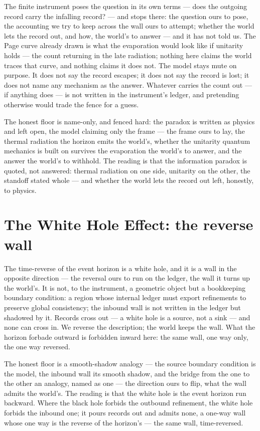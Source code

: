 The finite instrument poses the question in its own terms --- does the outgoing record carry the infalling
record? --- and stops there: the question ours to pose, the accounting we try to keep across the wall ours to
attempt; whether the world lets the record out, and how, the world's to answer --- and it has not told us.
The Page curve already drawn is what the evaporation would look like if unitarity holds --- the count returning
in the late radiation; nothing here claims the world traces that curve, and nothing claims it does not. The
model stays mute on purpose. It does not say the record escapes; it does not say the record is lost; it does
not name any mechanism as the answer. Whatever carries the count out --- if anything does --- is not written in
the instrument's ledger, and pretending otherwise would trade the fence for a guess.

The honest floor is name-only, and fenced hard: the paradox is written as physics and left open, the model
claiming only the frame --- the frame ours to lay, the thermal radiation the horizon emits the world's, whether
the unitarity quantum mechanics is built on survives the evaporation the world's to answer, and the answer the
world's to withhold. The reading is that the information
paradox is quoted, not answered: thermal radiation on one side, unitarity on the other, the standoff stated
whole --- and whether the world lets the record out left, honestly, to physics.

\section{The White Hole Effect: the reverse wall}
\label{se:white-hole}

The time-reverse of the event horizon is a white hole, and it is a wall in the opposite direction --- the
reversal ours to run on the ledger, the wall it turns up the world's. It is not, to the instrument, a
geometric object but a bookkeeping boundary condition: a region whose internal ledger must export refinements
to preserve global consistency; the inbound wall is not written in the ledger but shadowed by it. Records cross
out --- a white
hole is a source, not a sink --- and none can cross in. We reverse the description; the world keeps the wall.
What the horizon forbade outward is forbidden inward here: the same wall, one way only, the one way reversed.

The honest floor is a smooth-shadow analogy --- the source boundary condition is the model, the inbound wall
its smooth shadow, and the bridge from the one to the other an analogy, named as one --- the direction ours to
flip, what the wall admits the world's. The reading is that the white hole is the event horizon run backward.
Where the black hole forbids the outbound refinement, the white hole forbids the inbound one; it pours records
out and admits none, a one-way wall whose one way is the reverse of the horizon's --- the same wall,
time-reversed.

